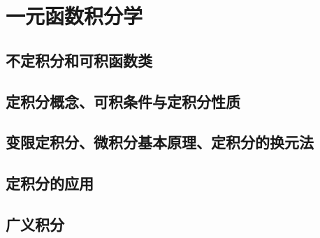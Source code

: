 \chapter{一元函数积分学}

\section{不定积分和可积函数类}

\section{定积分概念、可积条件与定积分性质}

\section{变限定积分、微积分基本原理、定积分的换元法}

\section{定积分的应用}

\section{广义积分}